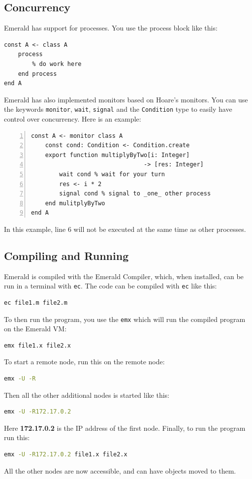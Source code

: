 \subsection{Concurrency}
Emerald has support for processes. You use the process block like this:
\begin{lstlisting}[language=emerald]
const A <- class A
    process
        % do work here
    end process
end A
\end{lstlisting}

Emerald has also implemented monitors based on Hoare's monitors\cite{hoare_monitors_1974}. You can use the keywords \verb|monitor|, \verb|wait|, \verb|signal| and the \verb|Condition| type to easily have control over concurrency. Here is an example:
\begin{lstlisting}[language=emerald, numbers=left]
const A <- monitor class A
    const cond: Condition <- Condition.create
    export function multiplyByTwo[i: Integer] 
                                -> [res: Integer]
        wait cond % wait for your turn
        res <- i * 2
        signal cond % signal to _one_ other process
    end mulitplyByTwo
end A
\end{lstlisting}
In this example, line 6 will not be executed at the same time as other processes.







\subsection{Compiling and Running}
Emerald is compiled with the Emerald Compiler\cite{noauthor_emeraldold-emerald_2019}, which, when installed, can be run in a terminal with \verb|ec|. The code can be compiled with \verb|ec| like this:
\begin{lstlisting}[language=Bash]
ec file1.m file2.m 
\end{lstlisting}
To then run the program, you use the \verb|emx| which will run the compiled program on the Emerald VM:
\begin{lstlisting}[language=Bash]
emx file1.x file2.x
\end{lstlisting}

To start a remote node, run this on the remote node:
\begin{lstlisting}[language=Bash]
emx -U -R
\end{lstlisting}
Then all the other additional nodes is started like this:
\begin{lstlisting}[language=Bash]
emx -U -R172.17.0.2
\end{lstlisting}
Here \textbf{172.17.0.2} is the IP address of the first node.
Finally, to run the program run this:
\begin{lstlisting}[language=Bash]
emx -U -R172.17.0.2 file1.x file2.x
\end{lstlisting}
All the other nodes are now accessible, and can have objects moved to them.



